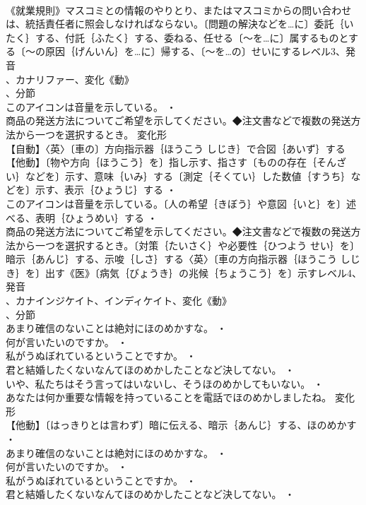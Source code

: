 \documentclass[8pt]{extreport}
\begin{document}
\begin{CJK}{UTF8}{min}
\\	《就業規則》マスコミとの情報のやりとり、またはマスコミからの問い合わせは、統括責任者に照会しなければならない。〔問題の解決などを…に〕委託｛いたく｝する、付託｛ふたく｝する、委ねる、任せる〔～を…に〕属するものとする〔～の原因｛げんいん｝を…に〕帰する、〔～を…の〕せいにするレベル3、発音
\\	、カナリファー、変化《動》
\\	、分節
\\	このアイコンは音量を示している。 ・
\\	商品の発送方法についてご希望を示してください。◆注文書などで複数の発送方法から一つを選択するとき。	変化形 
\\	【自動】〈英〉〔車の〕方向指示器｛ほうこう しじき｝で合図｛あいず｝する【他動】〔物や方向｛ほうこう｝を〕指し示す、指さす〔ものの存在｛そんざい｝などを〕示す、意味｛いみ｝する〔測定｛そくてい｝した数値｛すうち｝などを〕示す、表示｛ひょうじ｝する ・
\\	このアイコンは音量を示している。〔人の希望｛きぼう｝や意図｛いと｝を〕述べる、表明｛ひょうめい｝する ・
\\	商品の発送方法についてご希望を示してください。◆注文書などで複数の発送方法から一つを選択するとき。〔対策｛たいさく｝や必要性｛ひつよう せい｝を〕暗示｛あんじ｝する、示唆｛しさ｝する〈英〉〔車の方向指示器｛ほうこう しじき｝を〕出す《医》〔病気｛びょうき｝の兆候｛ちょうこう｝を〕示すレベル4、発音
\\	、カナインジケイト、インディケイト、変化《動》
\\	、分節
\\	あまり確信のないことは絶対にほのめかすな。 ・
\\	何が言いたいのですか。 ・
\\	私がうぬぼれているということですか。 ・
\\	君と結婚したくないなんてほのめかしたことなど決してない。 ・
\\	いや、私たちはそう言ってはいないし、そうほのめかしてもいない。 ・
\\	あなたは何か重要な情報を持っていることを電話でほのめかしましたね。	変化形 
\\	【他動】〔はっきりとは言わず〕暗に伝える、暗示｛あんじ｝する、ほのめかす ・
\\	あまり確信のないことは絶対にほのめかすな。 ・
\\	何が言いたいのですか。 ・
\\	私がうぬぼれているということですか。 ・
\\	君と結婚したくないなんてほのめかしたことなど決してない。 ・

\end{CJK}
\end{document}
